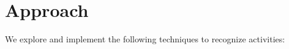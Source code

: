 \documentclass[11pt, oneside]{article}   	%
\begin{document}


\section{Approach}

We explore and implement the following techniques to recognize activities:
%
%
%
%
%
%
\end{document}
